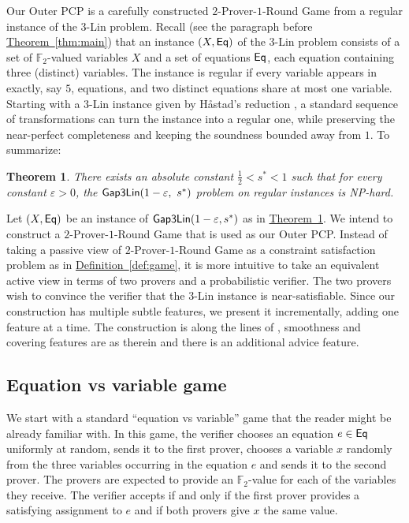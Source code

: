 \documentclass[11pt]{article}
\numberwithin{equation}{section}
\newtheorem{theorem}{Theorem}[section]
\theoremstyle{definition}
\theoremstyle{plain}
\newcommand{\expref}[2]{\hyperref[#2]{#1~\ref{#2}}}
\newcommand\eps{\varepsilon}
\begin{document}
Our Outer PCP is a carefully constructed $2$-Prover-$1$-Round Game from a regular instance of the $3$-Lin problem. Recall (see
the paragraph before \expref{Theorem}{thm:main}) that an instance $(X, {\sf Eq})$ of the $3$-Lin problem consists of a set of
${\mathbb F}_2$-valued variables $ X$ and a set of equations ${\sf Eq}$, each equation containing three (distinct) variables. The
instance is regular if  every variable appears in exactly, say $5$,
 equations, and two distinct equations share at most one variable.
 Starting with a $3$-Lin instance given by H\aa stad's reduction \cite{Has01}, a standard sequence of transformations can turn the
 instance into a regular one, while preserving the near-perfect completeness and keeping the soundness bounded away from $1$.
 To summarize:

 \begin{theorem}\label{thm:regular_3lin}
 There exists an absolute constant $\frac{1}{2} < s^* < 1 $ such that for every constant $\eps > 0$, the ${\sf Gap3Lin}(1-\eps, ~s^*)$
 problem on regular instances is NP-hard.
 \end{theorem}



Let $(X, {\sf Eq})$ be an instance of ${\sf Gap3Lin}(1-\eps, s^*)$ as in \expref{Theorem}{thm:regular_3lin}. We intend to construct a $2$-Prover-$1$-Round Game
that is used as our Outer PCP.  Instead
of taking a passive view of $2$-Prover-$1$-Round Game as a constraint satisfaction problem as in \expref{Definition}{def:game},
it is more intuitive to take
an equivalent active view in terms of two provers and a probabilistic verifier. The two provers wish to convince the verifier that the $3$-Lin instance
is near-satisfiable. Since our construction has multiple subtle features, we present it incrementally, adding one feature at a time.
The construction is along the lines of \cite{KS}, smoothness and covering features are as therein and there is an additional
advice feature.



\subsection{Equation vs variable game}



We start with a standard ``equation vs variable'' game that the reader might be already familiar with. In this game,
the verifier chooses an equation $e\in {\sf Eq}$ uniformly at random, sends it to
the first prover, chooses a variable $x$ randomly from the three variables occurring in the equation $e$ and sends it to the second prover.
The provers are expected to provide an ${\mathbb F}_2$-value for each of the variables they receive.
The verifier accepts if and only if the first prover provides a satisfying assignment to $e$ and if
both provers give $x$ the same value.
\end{document}
